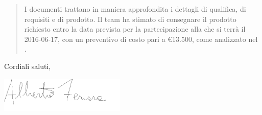 \begin{letter}
\begin{quotation}
\begin{itemize}
		\end{itemize}
		I documenti trattano in maniera approfondita i dettagli di qualifica, di requisiti e di prodotto.
		Il team ha stimato di consegnare il prodotto richiesto entro la data prevista per la partecipazione alla \RA{} che si terrà il 2016-06-17, con un preventivo di costo pari a \euro13.500, come analizzato nel \textit{\PdP}.	
	\end{quotation}
	\closing{Cordiali saluti,}
	\includegraphics[keepaspectratio = true, width=6cm]{Firma/AF.png}


\end{letter}


